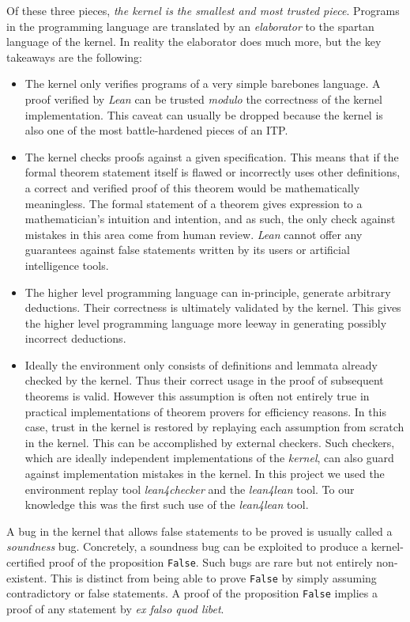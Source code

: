 Of these three pieces, \emph{the kernel is the smallest and most trusted piece}. Programs in the programming language are translated by an \emph{elaborator} to the spartan language of the kernel. In reality the elaborator does much more, but the key takeaways are the following:
\begin{itemize}
    \item The kernel only verifies programs of a very simple barebones language. A proof verified by \emph{Lean} can be trusted \emph{modulo} the correctness of the kernel implementation. This caveat can usually be dropped because the kernel is also one of the most battle-hardened pieces of an ITP.
    \item The kernel checks proofs against a given specification. This means that if the formal theorem statement itself is flawed or incorrectly uses other definitions, a correct and verified proof of this theorem would be mathematically meaningless. The formal statement of a theorem gives expression to a mathematician's intuition and intention, and as such, the only check against mistakes in this area come from human review. \emph{Lean} cannot offer any guarantees against false statements written by its users or artificial intelligence tools.
    \item The higher level programming language can in-principle, generate arbitrary deductions. Their correctness is ultimately validated by the kernel. This gives the higher level programming language more leeway in generating possibly incorrect deductions.
    \item Ideally the environment only consists of definitions and lemmata already checked by the kernel. Thus their correct usage in the proof of subsequent theorems is valid. However this assumption is often not entirely true in practical implementations of theorem provers for efficiency reasons. In this case, trust in the kernel is restored by replaying each assumption from scratch in the kernel. This can be accomplished by external checkers. Such checkers, which are ideally independent implementations of the \emph{kernel}, can also guard against implementation mistakes in the kernel. In this project we used the environment replay tool \textit{lean4checker} and the \textit{lean4lean} \cite{lean4lean} tool. To our knowledge this was the first such use of the \textit{lean4lean} tool.

\end{itemize}

\begin{remark}
    A bug in the kernel that allows false statements to be proved is usually called a \emph{soundness} bug. Concretely, a soundness bug can be exploited to produce a kernel-certified proof of the proposition \texttt{False}. Such bugs are rare but not entirely non-existent. This is distinct from being able to prove \texttt{False} by simply assuming contradictory or false statements. A proof of the proposition \texttt{False} implies a proof of any statement by \emph{ex falso quod libet}.
\end{remark}

